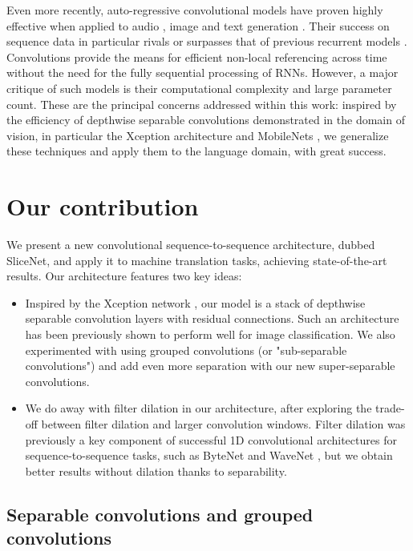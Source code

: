 \documentclass{article}
\begin{document}
Even more recently, auto-regressive convolutional models have proven highly effective when applied to audio \citep{wavenet2016}, image \citep{pixelcnn2016} and text generation \citep{bytenet2016}. Their success on sequence data in particular rivals or surpasses that of previous recurrent models \citep{bytenet2016,fbpaper}. Convolutions provide the means for efficient non-local referencing across time without the need for the fully sequential processing of RNNs. However, a major critique of such models is their computational complexity and large parameter count. These are the principal concerns addressed within this work: inspired by the efficiency of depthwise separable convolutions demonstrated in the domain of vision, in particular the Xception architecture \citep{xception2016} and MobileNets \citep{mobilenets2017}, we generalize these techniques and apply them to the language domain, with great success.


\section{Our contribution}

We present a new convolutional sequence-to-sequence architecture, dubbed SliceNet, and apply it to machine translation tasks, achieving state-of-the-art results. Our architecture features two key ideas:

\begin{itemize}
    \item Inspired by the Xception network \cite{xception2016}, our model is a stack of depthwise separable convolution layers with residual connections. Such an architecture has been previously shown to perform well for image classification. We also experimented with using grouped convolutions (or "sub-separable convolutions") and add even more separation with our new super-separable convolutions.

    \item We do away with filter dilation in our architecture, after exploring the trade-off between filter dilation and larger convolution windows. Filter dilation was previously a key component of successful 1D convolutional architectures for sequence-to-sequence tasks, such as ByteNet \citep{bytenet2016} and WaveNet \citep{wavenet2016}, but we obtain
    better results without dilation thanks to separability.

\end{itemize}


\subsection{Separable convolutions and grouped convolutions}
\end{document}
